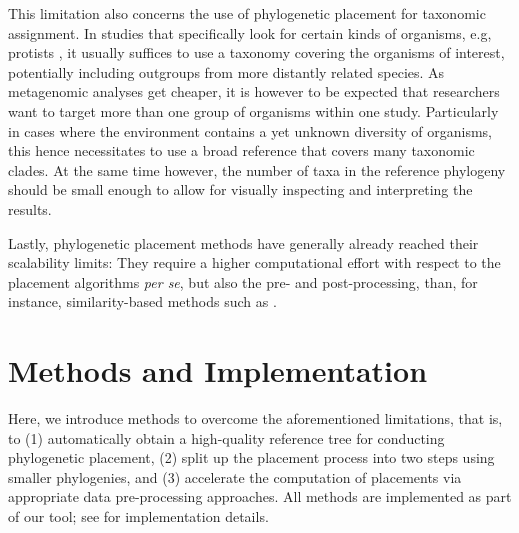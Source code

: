 This limitation also concerns the use of phylogenetic placement for taxonomic assignment.
In studies that specifically look for certain kinds of organisms, e.g, protists \citep{Mahe2017},
it usually suffices to use a taxonomy covering the organisms of interest,
potentially including outgroups from more distantly related species.
As metagenomic analyses get cheaper,
it is however to be expected that researchers want to target more than one group of organisms within one study.
Particularly in cases where the environment contains a yet unknown diversity of organisms,
this hence necessitates to use a broad reference that covers many taxonomic clades.
At the same time however, the number of taxa in the reference phylogeny
should be small enough to allow for visually inspecting and interpreting the results.

Lastly, phylogenetic placement methods have generally already reached their scalability limits:
They require a higher computational effort with respect to the placement algorithms \emph{per se},
but also the pre- and post-processing, than, for instance, similarity-based methods such as .



\section{Methods and Implementation}
\label{ch:AutomaticTrees:sec:Methods}


Here, we introduce methods to overcome the aforementioned limitations, that is, to
(1) automatically obtain a high-quality reference tree for conducting phylogenetic placement,
(2) split up the placement process into two steps using smaller phylogenies,
and (3) accelerate the computation of placements via appropriate data pre-processing approaches.
All methods are implemented as part of our  tool;
see  for implementation details.

